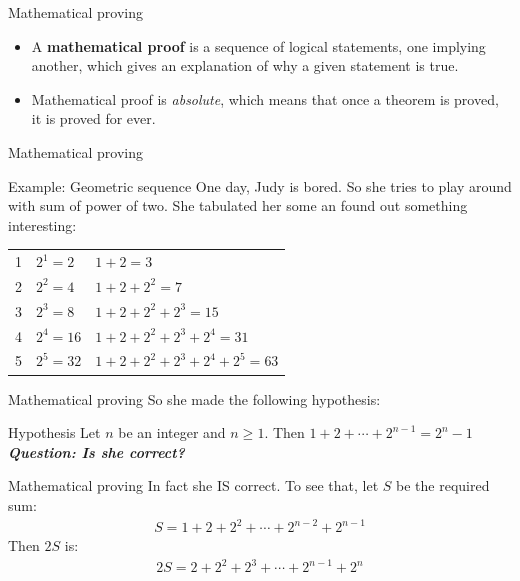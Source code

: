 \documentclass[10pt,xcolor={table,dvipsnames},t]{beamer}
\begin{document}
\begin{frame}{Mathematical proving}
  \begin{itemize}
    \item A \textbf{mathematical proof} is a sequence of logical statements, one implying another, which gives an explanation of why a given statement is true. 
    \item Mathematical proof is \textit{absolute}, which means that once a theorem is proved, it is proved for ever.
  \end{itemize}  
\end{frame}

\begin{frame}{Mathematical proving}
  \begin{exampleblock}{Example: Geometric sequence}
    One day, Judy is bored. So she tries to play around with sum of power of two. She tabulated her some an found out something interesting: 
    \begin{table}[]
      \begin{tabular}{lll}
      1 & $2^1 = 2$  & $1+2 = 3$                            \\
      2 & $2^2 = 4$  & $1+2+ 2^2 = 7$                       \\
      3 & $2^3 = 8$  & $1+2+2^2 + 2^3 = 15$                 \\
      4 & $2^4 = 16$ & $1 + 2 + 2^2 + 2^3 + 2^4 = 31$       \\
      5 & $2^5 = 32$ & $1 + 2 + 2^2 + 2^3 + 2^4 + 2^5 = 63$
      \end{tabular}
      \end{table}
  \end{exampleblock}
\end{frame}

\begin{frame}{Mathematical proving}
  So she made the following hypothesis:
  \begin{block}{Hypothesis}
    Let $n$ be an integer and $n\geq 1$. Then $1+2+\cdots + 2^{n-1} = 2^n -1$\\
    \textbf{\textit{Question: Is she correct? }}
  \end{block}
\end{frame}

\begin{frame}{Mathematical proving}
  In fact she IS correct. To see that, let $S$ be the required sum:
  \begin{align*}
    S = 1 + 2 + 2^2 + \cdots + 2^{n-2} + 2^{n-1}
  \end{align*}
  Then $2S$ is:
  \begin{align*}
    2S = 2 + 2^2 + 2^3 + \cdots + 2^{n-1} + 2^{n}
  \end{align*}
\end{frame}
\end{document}
